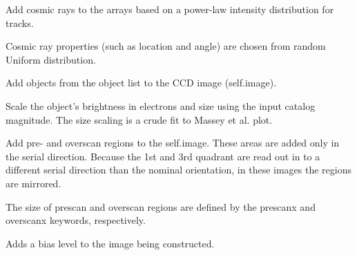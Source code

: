 \documentclass[a4paper,12pt,english]{sphinxmanual}
\begin{document}
\begin{fulllineitems}
\begin{fulllineitems}
\end{fulllineitems}


\begin{fulllineitems}
\label{simulator:simulator.simulator.VISsimulator.addCosmicRays}
Add cosmic rays to the arrays based on a power-law intensity distribution for tracks.

Cosmic ray properties (such as location and angle) are chosen from random Uniform distribution.

\end{fulllineitems}


\begin{fulllineitems}
\label{simulator:simulator.simulator.VISsimulator.addObjects}
Add objects from the object list to the CCD image (self.image).

Scale the object's brightness in electrons and size using the input catalog magnitude.
The size scaling is a crude fit to Massey et al. plot.

\end{fulllineitems}


\begin{fulllineitems}
\label{simulator:simulator.simulator.VISsimulator.addPreOverScans}
Add pre- and overscan regions to the self.image. These areas are added only in the serial direction.
Because the 1st and 3rd quadrant are read out in to a different serial direction than the nominal
orientation, in these images the regions are mirrored.

The size of prescan and overscan regions are defined by the prescanx and overscanx keywords, respectively.

\end{fulllineitems}


\begin{fulllineitems}
\label{simulator:simulator.simulator.VISsimulator.applyBias}
Adds a bias level to the image being constructed.


\end{fulllineitems}
\end{fulllineitems}
\end{document}
